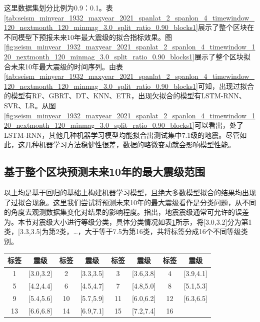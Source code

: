 这里数据集划分比例为0.9：0.1。表\ref{tab:seism_minyear_1932_maxyear_2021_spanlat_2_spanlon_4_timewindow_120_nextmonth_120_minmag_3.0_split_ratio_0.90_blocks1}展示了整个区块在不同模型下预报未来10年最大震级的拟合指标效果。图\ref{fig:seism_minyear_1932_maxyear_2021_spanlat_2_spanlon_4_timewindow_120_nextmonth_120_minmag_3.0_split_ratio_0.90_blocks1}展示了整个区块拟合未来10年最大震级的时间序列。由表\ref{tab:seism_minyear_1932_maxyear_2021_spanlat_2_spanlon_4_timewindow_120_nextmonth_120_minmag_3.0_split_ratio_0.90_blocks1}可知，出现过拟合的模型有RF、GBRT、DT、KNN、ETR，出现欠拟合的模型有LSTM-RNN、SVR、LR。从图\ref{fig:seism_minyear_1932_maxyear_2021_spanlat_2_spanlon_4_timewindow_120_nextmonth_120_minmag_3.0_split_ratio_0.90_blocks1}可以看出，处了LSTM-RNN，其他几种机器学习模型均能拟合出测试集中7.1级的地震。尽管如此，这几种机器学习方法稳健性很差，数据的略微变动就会影响模型性能。

\subsection{基于整个区块预测未来10年的最大震级范围}\label{sec:seism_result_10_class}

以上均是基于回归的基础上构建机器学习模型，且绝大多数模型拟合的结果均出现了过拟合现象。这里我们尝试将预测未来10年的最大震级看作是分类问题，从不同的角度去观测数据集变化对结果的影响程度。\citet{nan2019xinjiang}指出，地震震级通常可允许的误差为。本节对震级大小进行等级分类，具体分类情况如表\ref{tab:seism_class}所示，将[3.0,3.2]分为第1类，[3.3,3.5]为第2类，\ldots，大于等于7.5为第16类，共将标签分成16个不同等级类别。  

\begin{table}[!htbp]
  \centering
  \label{tab:seism_class}
  \footnotesize
  \begin{tabular}{cccccccc}
    \toprule
    标签 & 震级 & 标签 & 震级 & 标签 & 震级 & 标签 & 震级 \\
    \midrule
    1 & [3.0,3.2] & 2 & [3.3,3.5] & 3 & [3.6,3.8] & 4 & [3.9,4.1] \\
    5 & [4.2,4.4] & 6 & [4.5,4.7] & 7 & [4.8,5.0] & 8 & [5.1,5.3] \\
    9 & [5.4,5.6] & 10 & [5.7,5.9] & 11 & [6.0,6.2] & 12 & [6.3,6.5] \\
    13 & [6.6,6.8] & 14 & [6.9,7.1] & 15 & [7.2,7.4] & 16 & \ge 7.5 \\
    \bottomrule
  \end{tabular}
\end{table}

